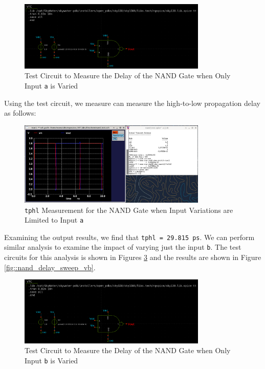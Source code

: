 \documentclass[fleqn]{article}
\begin{document}
	\begin{figure}[H]
		\centerline{\includegraphics[width=0.8\textwidth]{nand_delay_test_sweep_va.png}}
		\caption{Test Circuit to Measure the Delay of the NAND Gate when Only Input \texttt{a} is Varied}
		\label{fig::nand_delay_test_sweep_va}
	\end{figure}
	
	Using the test circuit, we measure can measure the high-to-low propagation delay as follows:
	
	\begin{figure}[H]
		\centerline{\includegraphics[width=0.8\textwidth]{nand_delay_sweep_va.png}}
		\caption{\texttt{tphl} Measurement for the NAND Gate when Input Variations are Limited to Input \texttt{a}}
		\label{fig::nand_delay_sweep_va}
	\end{figure}
	
	Examining the output results, we find that \texttt{tphl = 29.815 ps}. We can perform similar analysis to examine the impact of varying just the input \texttt{b}. The test circuits for this analysis is shown in Figures \ref{fig::nand_delay_test_sweep_vb} and the results are shown in Figure \ref{fig::nand_delay_sweep_vb}.
	
	\begin{figure}[H]
		\centerline{\includegraphics[width=0.8\textwidth]{nand_delay_test_sweep_vb.png}}
		\caption{Test Circuit to Measure the Delay of the NAND Gate when Only Input \texttt{b} is Varied}
		\label{fig::nand_delay_test_sweep_vb}
	\end{figure}
	
\end{document}
